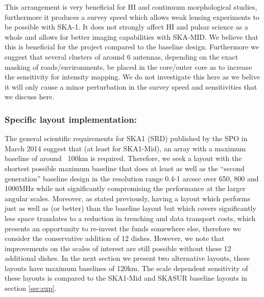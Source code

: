 \documentclass[sfheadings,a4paper,times,9pt,floats,floatfix]{article}
\begin{document}
This arrangement is very beneficial for HI and continuum morphological studies,
furthermore it produces a survey speed which allows weak lensing experiments to be
possible with SKA-1. It does not strongly affect HI and pulsar science as a whole and allows for
better imaging capabilities with SKA-MID. We believe that this is beneficial for the project
compared to the baseline design. Furthermore we suggest that several clusters of around 6
antennas, depending on the exact masking of roads/environments, be placed in the core/outer
core as to increase the sensitivity for intensity mapping. We do not
investigate this here as we belive it will only cause a minor perturbation in
the survey speed and sensitivities that we discuss here.

\subsubsection{Specific layout implementation:}
The general scientific requirements for SKA1\cite{srd} (SRD) published by the SPO in March 2014 suggest that (at least for
SKA1-Mid), an array with a maximum baseline of around ~100km is required. Therefore, we seek a layout with the shortest possible
maximum baseline that does at least as well as the ``second generation'' baseline design in the resolution range 0.4-1 arcsec over
650, 800 and 1000MHz while not significantly compromising the performance at the larger angular scales. Moreover, as stated
previously, having a layout which performs just as well as (or better) than the baseline layout but which covers significantly
less space translates to a reduction in trenching and data transport costs, which presents an opportunity to re-invest the funds
somewhere else, therefore we consider the conservative addition of 12 dishes. However, we note that improvements on the scales of
interest are still possible without these 12 additional dishes. In the next section we present two alternative
layouts, these layouts have maximum baselines of 120km. The scale dependent sensitivity of these layouts is
compared to the SKA1-Mid and SKASUR baseline layouts in section \ref{sec:exp}.
\end{document}
